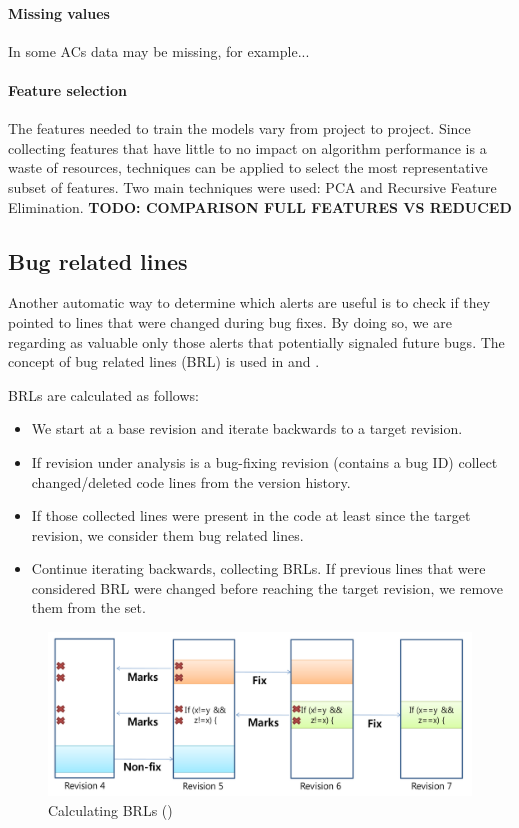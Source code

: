 \paragraph{Missing values} In some ACs data may be missing, for example...

\paragraph{Feature selection} The features needed to train the models vary from project to project. Since collecting features that have little to no impact on algorithm performance is a waste of resources, techniques can be applied to select the most representative subset of features. Two main techniques were used: PCA and Recursive Feature Elimination.
\textbf{TODO: COMPARISON FULL FEATURES VS REDUCED}

\subsection{Bug related lines}

Another automatic way to determine which alerts are useful is to check if they pointed to lines that were changed during bug fixes. By doing so, we are regarding as valuable only those alerts that potentially signaled future bugs. The concept of bug related lines (BRL) is used in \cite{which_warnings} and \cite{automatic_training_set}.

BRLs are calculated as follows:
\begin{itemize}
    \item We start at a base revision and iterate backwards to a target revision. 
    \item If revision under analysis is a bug-fixing revision (contains a bug ID) collect changed/deleted code lines from the version history.
    \item If those collected lines were present in the code at least since the target revision, we consider them bug related lines.
    \item Continue iterating backwards, collecting BRLs. If previous lines that were considered BRL were changed before reaching the target revision, we remove them from the set. 
\end{itemize}

\begin{figure}[H]
    \centering
    \includegraphics[scale=0.3]{./src/brl_example.png}
    \caption{Calculating BRLs (\cite{which_warnings})}
\end{figure}

